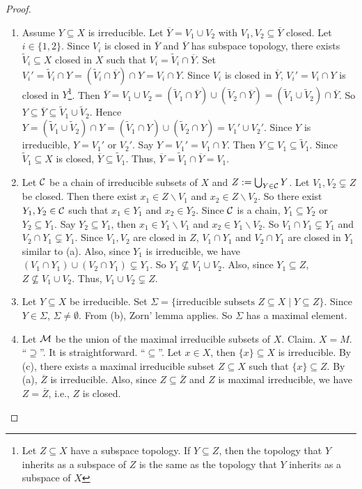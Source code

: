\begin{proof}
    \begin{enumerate}
        \item Assume $Y \subseteq X$ is irreducible. Let $\overbar Y = V_1 \cup V_2$ with $V_1,V_2 \subseteq \overbar Y$ closed. Let $i \in \{1,2\}$. Since $V_i$ is closed in $\overbar Y$ and $\overbar Y$ has subspace topology, there exists $\widetilde V_i \subseteq X$ closed in $X$ such that $V_i = \widetilde V_i \cap \overbar Y$. Set $V_i' = \widetilde V_i \cap Y = (\widetilde V_i \cap \overbar Y) \cap Y = V_i \cap Y$. Since $V_i$ is closed in $\overbar Y$, $V_i' = V_i \cap Y$ is closed in $Y$\footnote[2]{Let $Z \subseteq X$ have a subspace topology. If $Y \subseteq Z$, then the topology that $Y$ inherits as a subspace of $Z$ is the same as the topology that $Y$ inherits as a subspace of $X$}. Then $\overbar Y = V_1 \cup V_2 = (\widetilde V_1 \cap \overbar Y) \cup (\widetilde V_2 \cap \overbar Y) = (\widetilde V_1 \cup \widetilde V_2) \cap \overbar Y$. So $Y \subseteq \overbar Y \subseteq \widetilde V_1 \cup \widetilde V_2$. Hence $Y = (\widetilde V_1 \cup \widetilde V_2) \cap Y= (\widetilde V_1 \cap Y) \cup (\widetilde V_2 \cap Y) = V_1' \cup V_2'$. Since $Y$ is irreducible, $Y = V_1'$ or $V_2'$. Say $Y = V_1' = V_1 \cap Y$. Then $Y \subseteq V_1 \subseteq \widetilde V_1$. Since $\widetilde V_1 \subseteq X$ is closed, $\overbar Y \subseteq \widetilde V_1$. Thus, $\overbar Y = \widetilde V_1 \cap \overbar Y = V_1$. 
        \item 
            Let $\mathcal{C}$ be a chain of irreducible subsets of $X$ and $Z: = \bigcup_{Y \in \mathcal{C}}Y$. Let $V_1,V_2 \subsetneq Z$ be closed. Then there exist $x_1 \in Z \smallsetminus V_1$ and $x_2 \in Z \smallsetminus V_2$. So there exist $Y_1,Y_2 \in \mathcal{C}$ such that $x_1 \in Y_1$ and $x_2 \in Y_2$. Since $\mathcal{C}$ is a chain, $Y_1 \subseteq Y_2$ or $Y_2 \subseteq Y_1$. Say $Y_2 \subseteq Y_1$, then $x_1 \in Y_1 \smallsetminus V_1$ and $x_2 \in Y_1 \smallsetminus V_2$. So $V_1 \cap Y_1 \subsetneq Y_1$ and $V_2 \cap Y_1 \subsetneq Y_1$. Since $V_1,V_2$ are closed in $Z$, $V_1 \cap Y_1$ and $V_2 \cap Y_1$ are closed in $Y_1$ similar to (a). Also, since $Y_1$ is irreducible, we have $(V_1 \cap Y_1) \cup (V_2 \cap Y_1) \subsetneq Y_1$. So $Y_1 \not \subseteq V_1 \cup V_2$. Also, since $Y_1 \subseteq Z$, $Z \not \subseteq V_1 \cup V_2$. Thus, $V_1 \cup V_2 \subsetneq Z$.
        \item Let $Y \subseteq X$ be irreducible. Set $\Sigma = \{\text{irreducible subsets }Z \subseteq X \mid Y \subseteq Z\}$. Since $Y \in \Sigma$, $\Sigma \neq \emptyset$. From (b), Zorn' lemma applies. So $\Sigma$ has a maximal element.
    \item Let $\mathcal{M}$ be the union of the maximal irreducible subsets of $X$. Claim. $X = M$. ``$\supseteq$''. It is straightforward. ``$\subseteq$''. Let $x \in X$, then $\{x\} \subseteq X$ is irreducible. By (c), there exists a maximal irreducible subset $Z \subseteq X$ such that $\{x\} \subseteq Z$. By (a), $\overbar Z$ is irreducible. Also, since $Z \subseteq \overbar Z$ and $Z$ is maximal irreducible, we have $Z = \overbar Z$, i.e., $Z$ is closed. \qedhere
    \end{enumerate}
\end{proof}

